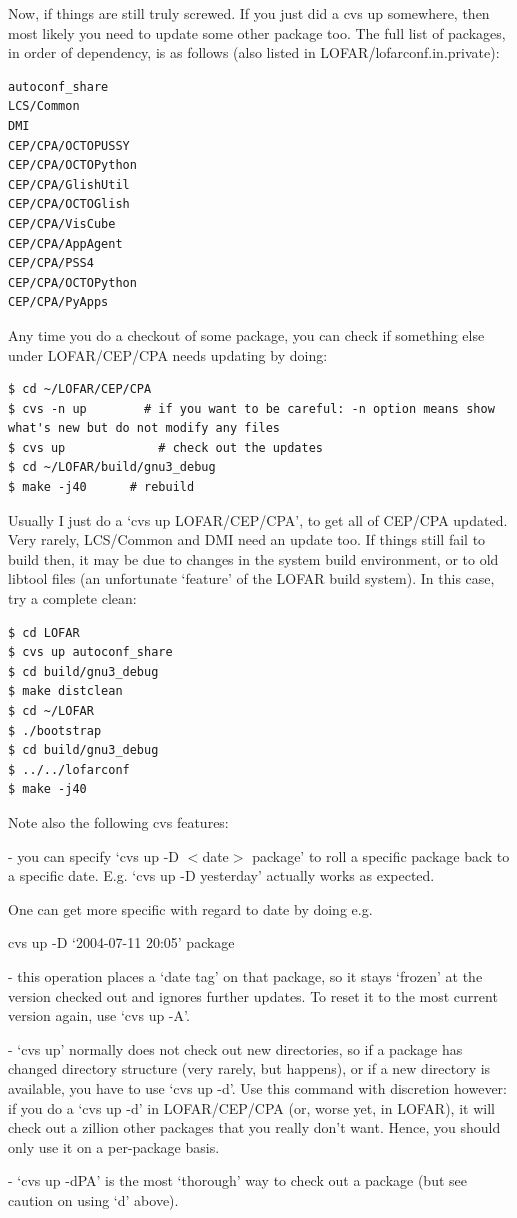 \documentclass[10pt]{article}
\begin{document}
Now, if things are still truly screwed. If you just did a cvs up 
somewhere, then most likely you need to update some other package too. 
The full list of packages, in order of dependency, is as follows (also 
listed in LOFAR/lofarconf.in.private):

\begin{verbatim}
autoconf_share
LCS/Common
DMI
CEP/CPA/OCTOPUSSY
CEP/CPA/OCTOPython
CEP/CPA/GlishUtil
CEP/CPA/OCTOGlish
CEP/CPA/VisCube
CEP/CPA/AppAgent
CEP/CPA/PSS4
CEP/CPA/OCTOPython
CEP/CPA/PyApps
\end{verbatim}

Any time you do a checkout of some package, you
can check if something else under LOFAR/CEP/CPA needs updating by doing:
                                                                                
\begin{verbatim}
$ cd ~/LOFAR/CEP/CPA
$ cvs -n up        # if you want to be careful: -n option means show
what's new but do not modify any files
$ cvs up             # check out the updates
$ cd ~/LOFAR/build/gnu3_debug
$ make -j40      # rebuild
\end{verbatim}

Usually I just do a `cvs up LOFAR/CEP/CPA', to get all of CEP/CPA updated.
Very rarely, LCS/Common and DMI need an update too. If things still fail to
build then, it may be due to changes in the system build environment, or to
old libtool files (an unfortunate `feature' of the LOFAR build system). In
this case, try a complete clean:

\begin{verbatim}
$ cd LOFAR
$ cvs up autoconf_share
$ cd build/gnu3_debug
$ make distclean
$ cd ~/LOFAR
$ ./bootstrap
$ cd build/gnu3_debug
$ ../../lofarconf 
$ make -j40
\end{verbatim}


Note also the following cvs features:

- you can specify `cvs up -D $<$date$>$ package' to roll a specific package
back to a specific date. E.g. `cvs up -D yesterday' actually works as
expected.

One can get more specific with regard to date by doing e.g.

 cvs up -D `2004-07-11 20:05' package

- this operation places a `date tag' on that package, so it stays `frozen'
at the version checked out and ignores further updates. To reset it to the
most current version again, use `cvs up -A'.

- `cvs up' normally does not check out new directories, so if a package has
changed directory structure (very rarely, but happens), or if a new
directory is available, you have to use `cvs up -d'. Use this command with
discretion however: if you do a `cvs up -d' in LOFAR/CEP/CPA (or, worse yet,
in LOFAR), it will check out a zillion other packages that you really don't
want. Hence, you should only use it on a per-package basis.

- `cvs up -dPA' is the most `thorough' way to check out a package (but see
caution on using `d' above).
  
\end{document}
